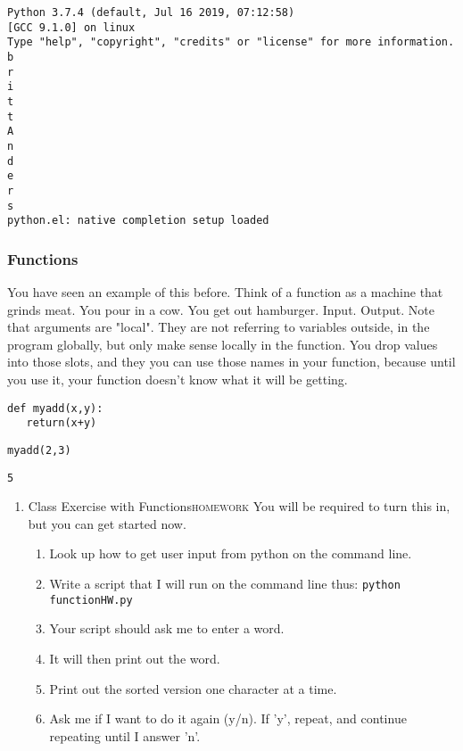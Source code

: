 \documentclass{article}
\begin{document}
\begin{enumerate}
\begin{enumerate}
\begin{verbatim}
Python 3.7.4 (default, Jul 16 2019, 07:12:58) 
[GCC 9.1.0] on linux
Type "help", "copyright", "credits" or "license" for more information.
b
r
i
t
t
A
n
d
e
r
s
python.el: native completion setup loaded
\end{verbatim}
\end{enumerate}
\end{enumerate}

\subsubsection{Functions}
\label{sec:org186699c}
You have seen an example of this before. Think of a function as a machine that grinds meat. You pour in a cow. You get out hamburger. Input. Output. Note that arguments are "local". They are not referring to variables outside, in the program globally, but only make sense locally in the function. You drop values into those slots, and they you can use those names  in your function, because until you use it, your function doesn't know what it will be getting. 
\begin{verbatim}
def myadd(x,y):
   return(x+y)
\end{verbatim}

\begin{verbatim}
myadd(2,3)
\end{verbatim}

\begin{verbatim}
5
\end{verbatim}

\begin{enumerate}
\item Class Exercise with Functions\hfill{}\textsc{homework}
\label{sec:org6930e0b}
You will be required to turn this in, but you can get started now. 
\begin{enumerate}
\item Look up how to get user input from python on the command line.
\item Write a script that I will run on the command line thus:
\texttt{python functionHW.py}
\item Your script should ask me to enter a word.
\item It will then print out the word.
\item Print out the sorted version one character at a time.
\item Ask me if I want to do it again (y/n). If 'y', repeat, and continue repeating until I answer 'n'.
\end{enumerate}
\end{enumerate}
\end{document}
